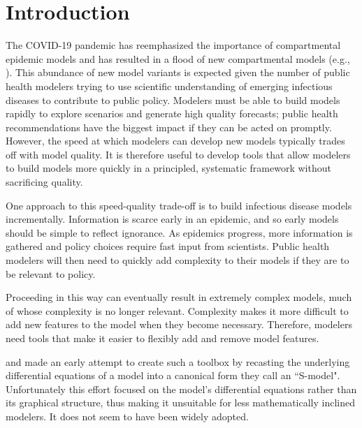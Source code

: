 \documentclass[referee,sn-basic]{sn-jnl}%
\theoremstyle{definition}
\begin{document}

\maketitle

\section{Introduction}\label{intro}
The COVID-19 pandemic has reemphasized the importance of compartmental epidemic models \citep{abou2020compartmental, massonis2021structural, adam2020special, currie2020simulation, lofgren2014mathematical, mcbryde2020role, enserink2020covid} and has resulted in a flood of new compartmental models (e.g., \cite{friston2020dynamic, fields2021age, chang2022stochastic, lavielle2020extension, balabdaoui2020age, leontitsis2021seahir, LeviEarn22}). 
This abundance of new model variants is expected given the number of public health modelers trying to use scientific understanding of emerging infectious diseases to contribute to public policy. Modelers must be able to build models rapidly to explore scenarios and generate high quality forecasts; public health recommendations have the biggest impact if they can be acted on promptly. However, the speed at which modelers can develop new models typically trades off with model quality. It is therefore useful to develop tools that allow modelers to build models more quickly in a principled, systematic framework without sacrificing quality. 

One approach to this speed-quality trade-off is to build infectious disease models incrementally. Information is scarce early in an epidemic, and so early models should be simple to reflect ignorance. As epidemics progress, more information is gathered and policy choices require fast input from scientists. Public health modelers will then need to quickly add complexity to their models if they are to be relevant to policy. 

Proceeding in this way can eventually result in extremely complex models, much of whose complexity is no longer relevant. Complexity makes it more difficult to add new features to the model when they become necessary. Therefore, modelers need tools that make it easier to flexibly add and remove model features. 

\cite{savageau1988introduction} and \cite{voit1988recasting, voit1990s} made an early attempt to create such a toolbox by recasting the underlying differential equations of a model into a canonical form they call an ``S-model". Unfortunately this effort focused on the model's differential equations rather than its graphical structure, thus making it unsuitable for less mathematically inclined modelers. It does not seem to have been widely adopted.
\end{document}
